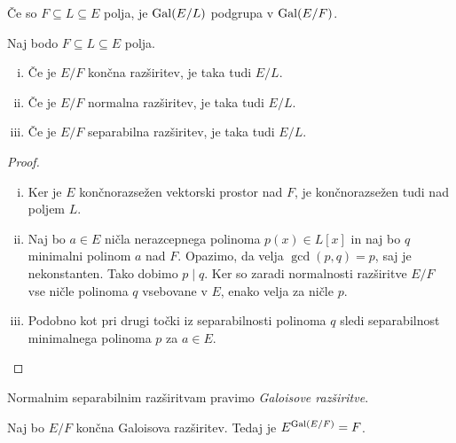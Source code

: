 \begin{opomba}
Če so $F \subseteq L \subseteq E$ polja, je $\operatorname{Gal}(E/L)$ podgrupa v
$\operatorname{Gal}(E/F)$.
\end{opomba}


\begin{lema}
Naj bodo $F \subseteq L \subseteq E$ polja.

\begin{enumerate}[i)]
\item Če je $E/F$ končna razširitev, je taka tudi $E/L$.
\item Če je $E/F$ normalna razširitev, je taka tudi $E/L$.
\item Če je $E/F$ separabilna razširitev, je taka tudi $E/L$.
\end{enumerate}
\end{lema}

\begin{proof}
\phantom{a}
\begin{enumerate}[i)]
\item Ker je $E$ končnorazsežen vektorski prostor nad $F$, je
končnorazsežen tudi nad poljem $L$.
\item Naj bo $a \in E$ ničla nerazcepnega polinoma $p(x) \in L[x]$
in naj bo $q$ minimalni polinom $a$ nad $F$. Opazimo, da velja
$\gcd(p, q) = p$, saj je nekonstanten. Tako dobimo $p \mid q$. Ker
so zaradi normalnosti razširitve $E/F$ vse ničle polinoma $q$
vsebovane v $E$, enako velja za ničle $p$.
\item Podobno kot pri drugi točki iz separabilnosti polinoma $q$
sledi separabilnost minimalnega polinoma $p$ za $a \in E$. \qedhere
\end{enumerate}
\end{proof}

\begin{definicija}
Normalnim separabilnim razširitvam pravimo
\emph{Galoisove razširitve}.
\end{definicija}

\begin{lema}
Naj bo $E/F$ končna Galoisova razširitev. Tedaj je
$E^{\operatorname{Gal}(E/F)} = F$.
\end{lema}

